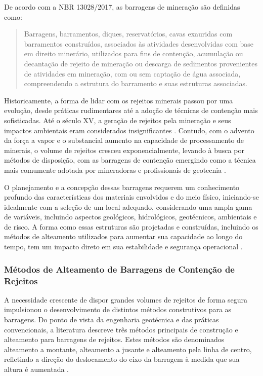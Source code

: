 De acordo com a NBR 13028/2017, as barragens de mineração são definidas como:

\begin{quote}
Barragens, barramentos, diques, reservatórios, cavas exauridas com barramentos construídos, associados às atividades desenvolvidas com base em direito minerário, utilizados para fins de contenção, acumulação ou decantação de rejeito de mineração ou descarga de sedimentos provenientes de atividades em mineração, com ou sem captação de água associada, compreendendo a estrutura do barramento e suas estruturas associadas. \cite{abnt2017}
\end{quote}

Historicamente, a forma de lidar com os rejeitos minerais passou por uma evolução, desde práticas rudimentares até a adoção de técnicas de contenção mais sofisticadas. Até o século XV, a geração de rejeitos pela mineração e seus impactos ambientais eram considerados insignificantes \cite{desouzajunior2018, freire2020}. Contudo, com o advento da força a vapor e o substancial aumento na capacidade de processamento de minerais, o volume de rejeitos cresceu exponencialmente, levando à busca por métodos de disposição, com as barragens de contenção emergindo como a técnica mais comumente adotada por mineradoras e profissionais de geotecnia \cite{desouzajunior2018}.

O planejamento e a concepção dessas barragens requerem um conhecimento profundo das características dos materiais envolvidos e do meio físico, iniciando-se idealmente com a seleção de um local adequado, considerando uma ampla gama de variáveis, incluindo aspectos geológicos, hidrológicos, geotécnicos, ambientais e de risco. A forma como essas estruturas são projetadas e construídas, incluindo os métodos de alteamento utilizados para aumentar sua capacidade ao longo do tempo, tem um impacto direto em sua estabilidade e segurança operacional \cite{lozano2006}.

\subsubsection{Métodos de Alteamento de Barragens de Contenção de Rejeitos}

A necessidade crescente de dispor grandes volumes de rejeitos de forma segura impulsionou o desenvolvimento de distintos métodos construtivos para as barragens. Do ponto de vista da engenharia geotécnica e das práticas convencionais, a literatura descreve três métodos principais de construção e alteamento para barragens de rejeitos. Estes métodos são denominados alteamento a montante, alteamento a jusante e alteamento pela linha de centro, refletindo a direção do deslocamento do eixo da barragem à medida que sua altura é aumentada \cite{soares2010}.

